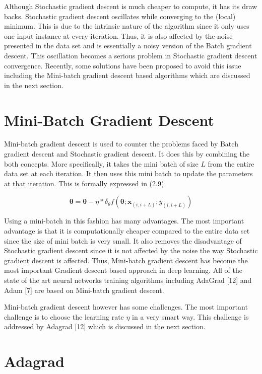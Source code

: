 Although Stochastic gradient descent is much cheaper to compute, it has its draw backs. Stochastic gradient descent oscillates while converging to the (local) minimum. This is due to the intrinsic nature of the algorithm since it only uses one input instance at every iteration. Thus, it is also affected by the noise presented in the data set and is essentially a noisy version of the Batch gradient descent. This oscillation becomes a serious problem in Stochastic gradient descent convergence. Recently, some solutions have been proposed to avoid this issue including the Mini-batch gradient descent based algorithms which are discussed in the next section.    

\section {Mini-Batch Gradient Descent}

Mini-batch gradient descent is used to counter the problems faced by Batch gradient descent and Stochastic gradient descent. It does this by combining the both concepts. More specifically, it takes the mini batch of size $L$ from the entire data set at each iteration. It then uses this mini batch to update the parameters at that iteration. This is formally expressed in (2.9).

\begin{equation}
\bm{\theta} = \bm{\theta} -\eta* \delta_\theta f(\bm{\theta};\textbf{x}_{(i,i+L)};y_{(i,i+L)})
\end{equation}

Using a mini-batch in this fashion has many advantages. The most important advantage is that it is computationally cheaper compared to the entire data set since the size of mini batch is very small. It also removes the disadvantage  of Stochastic gradient descent since it is not affected by the noise the way Stochastic gradient descent is affected. Thus, Mini-batch gradient descent has become the most important Gradient descent based approach in deep learning. All of the state of the art neural networks training algorithms including AdaGrad [12] and Adam [7] are based on Mini-batch gradient descent. 

Mini-batch gradient descent however has some challenges. The most important challenge is to choose the learning rate $\eta$ in a very smart way. This challenge is addressed by Adagrad [12] which is discussed in the next section. 

\section {Adagrad}

